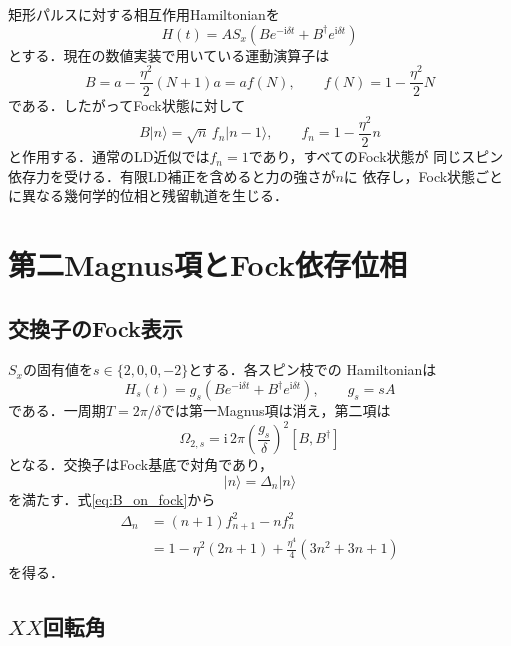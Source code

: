 \documentclass[dvipdfmx,a4paper,10pt]{jsarticle}
\newcommand{\ii}{\mathrm{i}}
\newcommand{\ket}[1]{\lvert #1\rangle}
\begin{document}
矩形パルスに対する相互作用Hamiltonianを
\begin{equation}
 H(t)=A S_x
 \left(
 B e^{-\ii\delta t}+B^\dagger e^{\ii\delta t}
 \right)
 \label{eq:hamiltonian}
\end{equation}
とする．現在の数値実装で用いている運動演算子は
\begin{equation}
 B
 =a-\frac{\eta^2}{2}(N+1)a
 =a f(N),
 \qquad
 f(N)=1-\frac{\eta^2}{2}N
 \label{eq:B_operator}
\end{equation}
である．したがってFock状態に対して
\begin{equation}
 B\ket{n}
 =\sqrt{n}\,f_n\ket{n-1},
 \qquad
 f_n=1-\frac{\eta^2}{2}n
 \label{eq:B_on_fock}
\end{equation}
と作用する．通常のLD近似では$f_n=1$であり，すべてのFock状態が
同じスピン依存力を受ける．有限LD補正を含めると力の強さが$n$に
依存し，Fock状態ごとに異なる幾何学的位相と残留軌道を生じる．

\section{第二Magnus項とFock依存位相}

\subsection{交換子のFock表示}

$S_x$の固有値を$s\in\{2,0,0,-2\}$とする．各スピン枝での
Hamiltonianは
\begin{equation}
 H_s(t)
 =g_s\left(
 B e^{-\ii\delta t}+B^\dagger e^{\ii\delta t}
 \right),
 \qquad g_s=sA
 \label{eq:branch_hamiltonian}
\end{equation}
である．一周期$T=2\pi/\delta$では第一Magnus項は消え，第二項は
\begin{equation}
 \Omega_{2,s}
 =\ii\,2\pi
 \left(\frac{g_s}{\delta}\right)^2
 [B,B^\dagger]
 \label{eq:omega2}
\end{equation}
となる．交換子はFock基底で対角であり，
\begin{equation}
 [B,B^\dagger]\ket{n}
 =\Delta_n\ket{n}
\end{equation}
を満たす．式\eqref{eq:B_on_fock}から
\begin{align}
 \Delta_n
 &=(n+1)f_{n+1}^2-nf_n^2\nonumber\\
 &=1-\eta^2(2n+1)
 +\frac{\eta^4}{4}(3n^2+3n+1)
 \label{eq:delta_n}
\end{align}
を得る．

\subsection{$XX$回転角}
\end{document}
